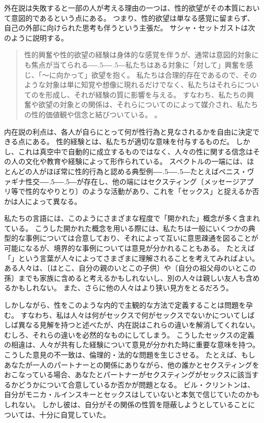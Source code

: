\documentclass[paper=a4,book,openany]{jlreq}
\def\DDASH{―\kern-.5\zw―\kern-.5\zw―}
\begin{document}
外在説は失敗すると一部の人が考える理由の一つは、性的欲望がその本質において意図的であるという点にある。
つまり、性的欲望は単なる感覚に留まらず、自己の外部に向けられた思考も伴うという主張だ。
サシャ・セットガストは次のように説明する。
\begin{quote}
  性的興奮や性的欲望の経験は身体的な感覚を伴うが、通常は意図的対象にも焦点が当てられる{\DDASH}私たちはある対象に「対して」興奮を感じ、「～に向かって」欲望を抱く。
私たちは合理的存在であるので、そのような対象は単に知覚や想像に現れるだけでなく、私たちはそれらについてのを形成し、それが経験の質に影響を与える。
すなわち、私たちの興奮や欲望の対象との関係は、それらについてのによって媒介され、私たちの性的価値観や信念と結びついている。  \citep[p. 384, 強調は原文]{settegast18:_prost_good_sex}。
\end{quote}

内在説の利点は、各人が自らにとって何が性行為と見なされるかを自由に決定できる点にある。
性的経験とは、私たちが適切な意味を付与するものだ。
しかし、これは真空中で自動的に成立するものではなく、人々の性に関する信念はその人の文化や教育や経験によって形作られている。
スペクトルの一端には、ほとんどの人がほぼ常に性的行為と認める典型例{\DDASH}たとえばペニス・ヴァギナ性交{\DDASH}が存在し、他の端にはセクスティング〔メッセージアプリ等で性的なやりとり〕のような活動があり、これを「セックス」と捉えるか否かは人によって異なる。

私たちの言語には、このようにさまざまな程度で「開かれた」概念が多く含まれている。
こうした開かれた概念を用いる際には、私たちは一般にいくつかの典型的な事例については合意しており、それによって互いに意思疎通を図ることが可能になるが、境界的な事例については意見が分かれることもある。
たとえば「」という言葉が人々によってさまざまに理解されることを考えてみればよい。
ある人々は、〔はとこ、自分の親のいとこの子供〕や〔自分の祖父母のいとこの孫〕までも家族に含めると考えるかもしれないし、別の人々は親しい友人も含めるかもしれない。
また、さらに他の人々はより狭い見方をとるだろう。

しかしながら、性をこのような内的で主観的な方法で定義することは問題を孕む。
すなわち、私は人々は何がセックスで何がセックスでないかについてしばしば異なる見解を持つと述べたが、内在説はこれらの違いを解消してくれない。
むしろ、それらの違いを必然的なものにしてしまう。
こうしたセックスの定義の相違は、人々が共有した経験について意見が分かれた時に重要な意味を持つ。
こうした意見の不一致は、倫理的・法的な問題を生じさせる。
たとえば、もしあなたが一人のパートナーとの関係にありながら、他の誰かとセクスティングをおこなっている場合、あなたとパートナーがセクスティングがセックスに該当するかどうかについて合意しているか否かが問題となる。
ビル・クリントンは、自分がモニカ・ルインスキーとセックスはしていないと本気で信じていたのかもしれない。
しかし彼は、自分がその関係の性質を隠蔽しようとしていることについては、十分に自覚していた。
\end{document}
